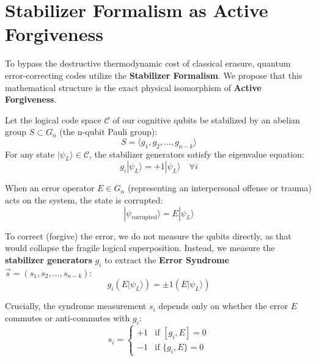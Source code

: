 \documentclass[11pt,twocolumn]{article}
\begin{document}
\section{Stabilizer Formalism as Active Forgiveness}

To bypass the destructive thermodynamic cost of classical erasure, quantum error-correcting codes utilize the \textbf{Stabilizer Formalism}. We propose that this mathematical structure is the exact physical isomorphism of \textbf{Active Forgiveness}.

Let the logical code space $\mathcal{C}$ of our cognitive qubits be stabilized by an abelian group $S \subset G_n$ (the n-qubit Pauli group):
\begin{equation}
S = \langle g_1, g_2, \dots, g_{n-k} \rangle
\end{equation}
For any state $|\psi_L\rangle \in \mathcal{C}$, the stabilizer generators satisfy the eigenvalue equation:
\begin{equation}
g_i |\psi_L\rangle = +1 |\psi_L\rangle \quad \forall i
\end{equation}

When an error operator $E \in G_n$ (representing an interpersonal offense or trauma) acts on the system, the state is corrupted:
\begin{equation}
|\psi_{\text{corrupted}}\rangle = E |\psi_L\rangle
\end{equation}

To correct (forgive) the error, we do not measure the qubits directly, as that would collapse the fragile logical superposition. Instead, we measure the \textbf{stabilizer generators} $g_i$ to extract the \textbf{Error Syndrome} $\vec{s} = (s_1, s_2, \dots, s_{n-k})$:
\begin{equation}
g_i (E |\psi_L\rangle) = \pm 1 (E |\psi_L\rangle)
\end{equation}

Crucially, the syndrome measurement $s_i$ depends only on whether the error $E$ commutes or anti-commutes with $g_i$:
\begin{equation}
s_i = \begin{cases} +1 & \text{if } [g_i, E] = 0 \\ -1 & \text{if } \{g_i, E\} = 0 \end{cases}
\end{equation}
\end{document}

